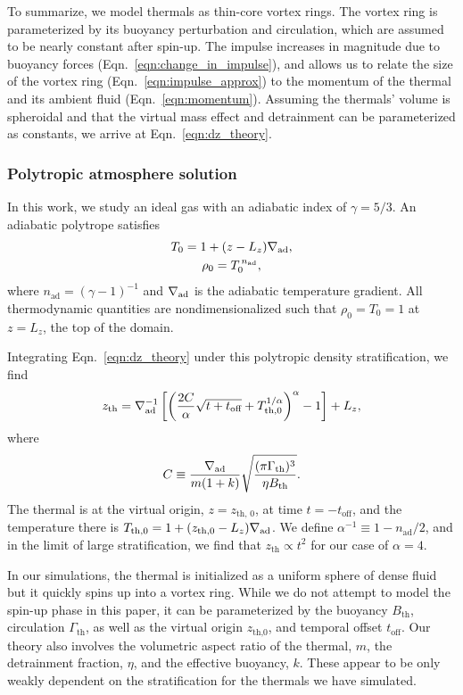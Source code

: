 To summarize, we model thermals as thin-core vortex rings.
The vortex ring is parameterized by its buoyancy perturbation and circulation, which are assumed to be nearly constant after spin-up.
The impulse increases in magnitude due to buoyancy forces (Eqn.~\ref{eqn:change_in_impulse}), and allows us to relate the size of the vortex ring (Eqn.~\ref{eqn:impulse_approx}) to the momentum of the thermal and its ambient fluid (Eqn.~\ref{eqn:momentum}).
Assuming the thermals' volume is spheroidal and that the virtual mass effect and detrainment can be parameterized as constants, we arrive at Eqn.~\ref{eqn:dz_theory}.

\subsubsection{Polytropic atmosphere solution}
In this work, we study an ideal gas with an adiabatic index of $\gamma = 5/3$.
An adiabatic polytrope satisfies
\begin{gather}\label{eqn:T0}
T_0 = 1 + (z - L_z)\nabla_{\text{ad}}, \\
\rho_0 = T_0^{\,n_{\text{ad}}},
\label{eqn:polytrope}
\end{gather}
where $n_{\text{ad}} = (\gamma-1)^{-1}$ and $\nabla_{\text{ad}}$ is the adiabatic temperature gradient.
All thermodynamic quantities are nondimensionalized such that $\rho_0 = T_0 = 1$ at $z = L_z$, the top of the domain.

Integrating Eqn.~\ref{eqn:dz_theory} under this polytropic density stratification, we find
\begin{equation}
z_{\text{th}} = \nabla_{\text{ad}}^{-1}\left[\left(\frac{2C}{ \alpha } \sqrt{t + t_{\text{off}}} + T_{\text{th},0}^{1/\alpha}  \right)^{\alpha} - 1\right] + L_z,
\label{eqn:theory_z}
\end{equation}
where 
$$
C \equiv \frac{\nabla_{\text{ad}}}{m(1 + k)} \sqrt{\frac{(\pi\Gamma_{\text{th}})^3}{\eta B_{\text{th}}}}.
$$ 
The thermal is at the virtual origin, $z=z_{\text{th, 0}}$, at time $t=-t_{\text{off}}$, and the temperature there is $T_{\text{th},0} = 1 + (z_{\text{th},0} - L_z)\nabla_{\text{ad}}$.
We define $\alpha^{-1} \equiv 1 - n_{\text{ad}}/2$, and in the limit of large stratification, we find that $z_{\text{th}} \propto t^2$ for our case of $\alpha = 4$. 

In our simulations, the thermal is initialized as a uniform sphere of dense fluid but it quickly spins up into a vortex ring. 
While we do not attempt to model the spin-up phase in this paper, it can be parameterized by the buoyancy $B_{\text{th}}$, circulation $\Gamma_{\text{th}}$, as well as the virtual origin $z_{\text{th,0}}$, and temporal offset $t_{\text{off}}$. 
Our theory also involves the volumetric aspect ratio of the thermal, $m$, the detrainment fraction, $\eta$, and the effective buoyancy, $k$. 
These appear to be only weakly dependent on the stratification for the thermals we have simulated.



